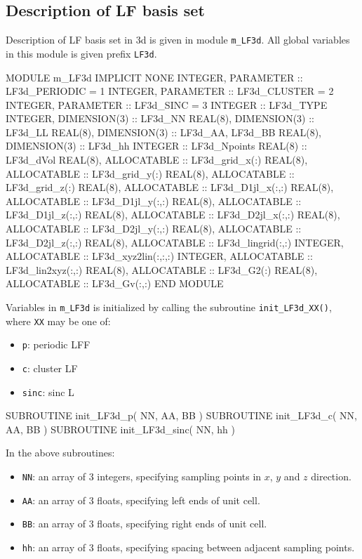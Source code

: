 \subsection{Description of LF basis set}

Description of LF basis set in 3d is given in module
{\tt m\_LF3d}. All global variables in this module is given
prefix {\tt LF3d}.

\begin{fortrancode}
MODULE m_LF3d
  IMPLICIT NONE
  INTEGER, PARAMETER :: LF3d_PERIODIC = 1
  INTEGER, PARAMETER :: LF3d_CLUSTER  = 2
  INTEGER, PARAMETER :: LF3d_SINC     = 3
  INTEGER :: LF3d_TYPE
  INTEGER, DIMENSION(3) :: LF3d_NN
  REAL(8), DIMENSION(3) :: LF3d_LL
  REAL(8), DIMENSION(3) :: LF3d_AA, LF3d_BB
  REAL(8), DIMENSION(3) :: LF3d_hh
  INTEGER :: LF3d_Npoints
  REAL(8) :: LF3d_dVol
  REAL(8), ALLOCATABLE :: LF3d_grid_x(:)
  REAL(8), ALLOCATABLE :: LF3d_grid_y(:)
  REAL(8), ALLOCATABLE :: LF3d_grid_z(:)
  REAL(8), ALLOCATABLE :: LF3d_D1jl_x(:,:)
  REAL(8), ALLOCATABLE :: LF3d_D1jl_y(:,:)
  REAL(8), ALLOCATABLE :: LF3d_D1jl_z(:,:)
  REAL(8), ALLOCATABLE :: LF3d_D2jl_x(:,:)
  REAL(8), ALLOCATABLE :: LF3d_D2jl_y(:,:)
  REAL(8), ALLOCATABLE :: LF3d_D2jl_z(:,:)
  REAL(8), ALLOCATABLE :: LF3d_lingrid(:,:)
  INTEGER, ALLOCATABLE :: LF3d_xyz2lin(:,:,:)
  INTEGER, ALLOCATABLE :: LF3d_lin2xyz(:,:)
  REAL(8), ALLOCATABLE :: LF3d_G2(:)
  REAL(8), ALLOCATABLE :: LF3d_Gv(:,:)
END MODULE
\end{fortrancode}

Variables in {\tt m\_LF3d} is initialized by calling the subroutine
{\tt init\_LF3d\_XX()}, where {\tt XX} may be one of:
\begin{itemize}
\item {\tt p}: periodic LFF
\item {\tt c}: cluster LF
\item {\tt sinc}: sinc L
\end{itemize}

\begin{fortrancode}
SUBROUTINE init_LF3d_p( NN, AA, BB )
SUBROUTINE init_LF3d_c( NN, AA, BB )
SUBROUTINE init_LF3d_sinc( NN, hh )
\end{fortrancode}

In the above subroutines:
\begin{itemize}
\item {\tt NN}: an array of 3 integers, specifying sampling points in $x$,
$y$ and $z$ direction.
\item {\tt AA}: an array of 3 floats, specifying left ends of unit cell.
\item {\tt BB}: an array of 3 floats, specifying right ends of unit cell.
\item {\tt hh}: an array of 3 floats, specifying spacing between adjacent sampling points.
\end{itemize}

